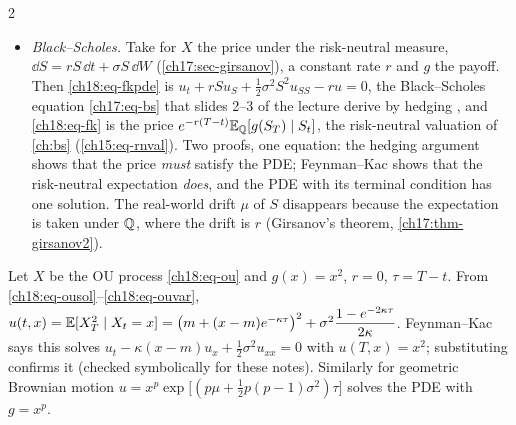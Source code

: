 \begin{paracol}{2}
\begin{itemize}
  \item \emph{Black--Scholes.} Take for $X$ the price under the risk-neutral measure, $\dd S=rS\,\dd t+\sigma S\,\dd W$ (\cref{ch17:sec-girsanov}), a constant rate $r$ and $g$ the payoff. Then \eqref{ch18:eq-fkpde} is $u_t+rSu_S+\tfrac12\sigma^2S^2u_{SS}-ru=0$, the Black--Scholes equation \eqref{ch17:eq-bs} that slides 2--3 of the lecture derive by hedging , and \eqref{ch18:eq-fk} is the price $e^{-r(T-t)}\mathbb{E}_{\mathbb{Q}}[g(S_T)\mid S_t]$, the risk-neutral valuation of \cref{ch:bs} (\cref{ch15:eq-rnval}). Two proofs, one equation: the hedging argument shows that the price \emph{must} satisfy the PDE; Feynman--Kac shows that the risk-neutral expectation \emph{does}, and the PDE with its terminal condition has one solution. The real-world drift $\mu$ of $S$ disappears because the expectation is taken under $\mathbb{Q}$, where the drift is $r$ (Girsanov's theorem, \cref{ch17:thm-girsanov2}).
\end{itemize}

\begin{example}\label{ch18:ex-fkou}
Let $X$ be the OU process \eqref{ch18:eq-ou} and $g(x)=x^2$, $r=0$, $\tau=T-t$. From \eqref{ch18:eq-ousol}--\eqref{ch18:eq-ouvar}, $u(t,x)=\mathbb{E}[X_T^2\mid X_t=x]=\bigl(m+(x-m)e^{-\kappa\tau}\bigr)^2+\sigma^2\dfrac{1-e^{-2\kappa\tau}}{2\kappa}$. Feynman--Kac says this solves $u_t-\kappa(x-m)u_x+\tfrac12\sigma^2u_{xx}=0$ with $u(T,x)=x^2$; substituting confirms it (checked symbolically for these notes). Similarly for geometric Brownian motion $u=x^p\exp\bigl[(p\mu+\tfrac12p(p-1)\sigma^2)\tau\bigr]$ solves the PDE with $g=x^p$.
\end{example}


\end{paracol}
